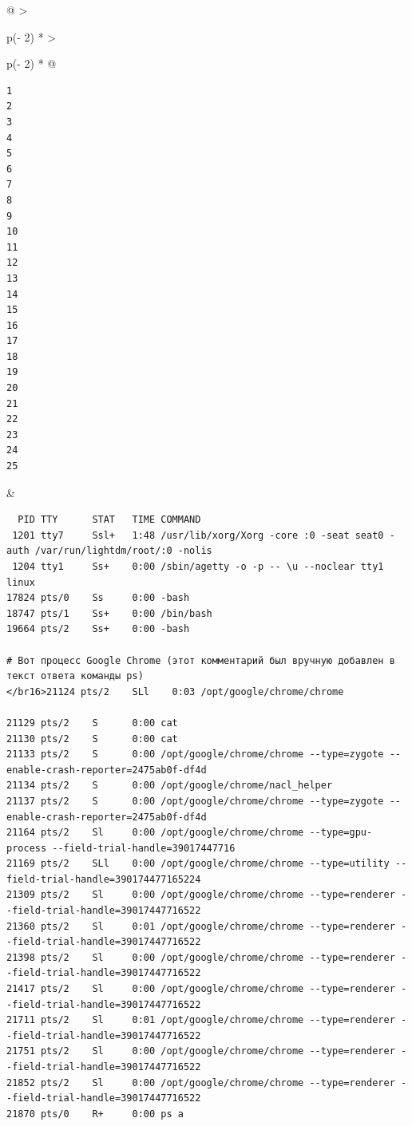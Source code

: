 \documentclass{report}
\begin{document}
\begin{longtable}[]{@{}
  >{\raggedright\arraybackslash}p{(\columnwidth - 2\tabcolsep) * }
  >{\raggedright\arraybackslash}p{(\columnwidth - 2\tabcolsep) * }@{}}
\toprule
\endhead
\begin{minipage}[t]{\linewidth}\raggedright
\begin{verbatim}
1
2
3
4
5
6
7
8
9
10
11
12
13
14
15
16
17
18
19
20
21
22
23
24
25
\end{verbatim}
\end{minipage} & \begin{minipage}[t]{\linewidth}\raggedright
\begin{verbatim}
  PID TTY      STAT   TIME COMMAND
 1201 tty7     Ssl+   1:48 /usr/lib/xorg/Xorg -core :0 -seat seat0 -auth /var/run/lightdm/root/:0 -nolis
 1204 tty1     Ss+    0:00 /sbin/agetty -o -p -- \u --noclear tty1 linux
17824 pts/0    Ss     0:00 -bash
18747 pts/1    Ss+    0:00 /bin/bash
19664 pts/2    Ss+    0:00 -bash

# Вот процесс Google Chrome (этот комментарий был вручную добавлен в текст ответа команды ps)
</br16>21124 pts/2    SLl    0:03 /opt/google/chrome/chrome

21129 pts/2    S      0:00 cat
21130 pts/2    S      0:00 cat
21133 pts/2    S      0:00 /opt/google/chrome/chrome --type=zygote --enable-crash-reporter=2475ab0f-df4d
21134 pts/2    S      0:00 /opt/google/chrome/nacl_helper
21137 pts/2    S      0:00 /opt/google/chrome/chrome --type=zygote --enable-crash-reporter=2475ab0f-df4d
21164 pts/2    Sl     0:00 /opt/google/chrome/chrome --type=gpu-process --field-trial-handle=39017447716
21169 pts/2    SLl    0:00 /opt/google/chrome/chrome --type=utility --field-trial-handle=390174477165224
21309 pts/2    Sl     0:00 /opt/google/chrome/chrome --type=renderer --field-trial-handle=39017447716522
21360 pts/2    Sl     0:01 /opt/google/chrome/chrome --type=renderer --field-trial-handle=39017447716522
21398 pts/2    Sl     0:00 /opt/google/chrome/chrome --type=renderer --field-trial-handle=39017447716522
21417 pts/2    Sl     0:00 /opt/google/chrome/chrome --type=renderer --field-trial-handle=39017447716522
21711 pts/2    Sl     0:01 /opt/google/chrome/chrome --type=renderer --field-trial-handle=39017447716522
21751 pts/2    Sl     0:00 /opt/google/chrome/chrome --type=renderer --field-trial-handle=39017447716522
21852 pts/2    Sl     0:00 /opt/google/chrome/chrome --type=renderer --field-trial-handle=39017447716522
21870 pts/0    R+     0:00 ps a
\end{verbatim}
\end{minipage} \\ \addlinespace
\bottomrule
\end{longtable}
\end{document}
